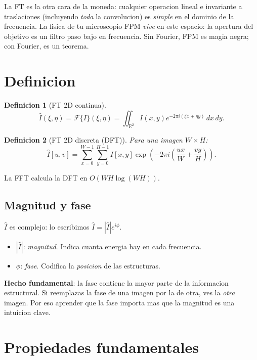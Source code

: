 \documentclass[11pt,a4paper,twoside,openright]{book}
\newtheorem{definicion}{Definicion}[chapter]
\begin{document}
La FT es la otra cara de la moneda: cualquier operacion lineal e invariante a traslaciones (incluyendo \emph{toda} la convolucion) es \emph{simple} en el dominio de la frecuencia. La fisica de tu microscopio FPM \emph{vive} en este espacio: la apertura del objetivo es un filtro paso bajo en frecuencia. Sin Fourier, FPM es magia negra; con Fourier, es un teorema.

\section{Definicion}

\begin{definicion}[FT 2D continua]
\begin{equation}
\hat{I}(\xi, \eta) = \mathcal{F}\{I\}(\xi, \eta) = \iint_{\mathbb{R}^2} I(x,y) e^{-2\pi i (\xi x + \eta y)}\, dx\, dy.
\end{equation}
\end{definicion}

\begin{definicion}[FT 2D discreta (DFT)]
Para una imagen $W{\times}H$:
\begin{equation}
\hat{I}[u,v] = \sum_{x=0}^{W-1} \sum_{y=0}^{H-1} I[x,y] \exp\!\left(-2\pi i \left(\frac{ux}{W} + \frac{vy}{H}\right)\right).
\end{equation}
\end{definicion}

La FFT calcula la DFT en $O(WH \log(WH))$.

\subsection{Magnitud y fase}
$\hat{I}$ es complejo: lo escribimos $\hat{I} = |\hat{I}| e^{i\phi}$.

\begin{itemize}[leftmargin=2em]
  \item $|\hat{I}|$: \emph{magnitud}. Indica cuanta energia hay en cada frecuencia.
  \item $\phi$: \emph{fase}. Codifica la \emph{posicion} de las estructuras.
\end{itemize}

\textbf{Hecho fundamental}: la fase contiene la mayor parte de la informacion estructural. Si reemplazas la fase de una imagen por la de otra, ves la \emph{otra} imagen. Por eso aprender que la fase importa mas que la magnitud es una intuicion clave.

\section{Propiedades fundamentales}
\end{document}
